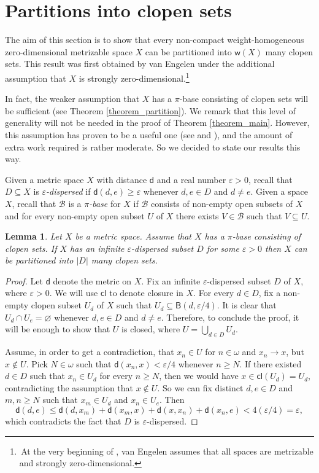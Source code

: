 \documentclass{amsart}
\theoremstyle{plain}
\newtheorem{lemma}[theorem]{Lemma}
\theoremstyle{definition}
\newcommand{\Ball}{\mathsf{B}}
\newcommand{\di}{\mathsf{d}}
\newcommand{\cl}{\mathsf{cl}}
\newcommand{\weight}{\mathsf{w}}
\newcommand{\BB}{\mathcal{B}}
\begin{document}
\section{Partitions into clopen sets}

The aim of this section is to show that every non-compact weight-homogeneous zero-dimensional metrizable space $X$ can be partitioned into $\weight(X)$ many clopen sets. This result was first obtained by van Engelen \cite[Lemma 2.1]{van_engelen} under the additional assumption that $X$ is strongly zero-dimensional.\footnote{\,At the very beginning of \cite[Section 2]{van_engelen}, van Engelen assumes that all spaces are metrizable and strongly zero-dimensional.}

In fact, the weaker assumption that $X$ has a $\pi$-base consisting of clopen sets will be sufficient (see Theorem \ref{theorem_partition}). We remark that this level of generality will not be needed in the proof of Theorem \ref{theorem_main}. However, this assumption has proven to be a useful one (see \cite{medini_products} and \cite{terada}), and the amount of extra work required is rather moderate. So we decided to state our results this way.

Given a metric space $X$ with distance $\di$ and a real number $\varepsilon >0$, recall that $D\subseteq X$ is \emph{$\varepsilon$-dispersed} if $\di(d,e)\geq\varepsilon$ whenever $d,e\in D$ and $d\neq e$. Given a space $X$, recall that $\BB$ is a \emph{$\pi$-base} for $X$ if $\BB$ consists of non-empty open subsets of $X$ and for every non-empty open subset $U$ of $X$ there exists $V\in\BB$ such that $V\subseteq U$.

\begin{lemma}\label{lemma_epsilon_dispersed}
Let $X$ be a metric space. Assume that $X$ has a $\pi$-base consisting of clopen sets. If $X$ has an infinite $\varepsilon$-dispersed subset $D$ for some $\varepsilon>0$ then $X$ can be partitioned into $|D|$ many clopen sets.
\end{lemma}
\begin{proof}
Let $\di$ denote the metric on $X$. Fix an infinite $\varepsilon$-dispersed subset $D$ of $X$, where $\varepsilon >0$. We will use $\cl$ to denote closure in $X$. For every $d\in D$, fix a non-empty clopen subset $U_d$ of $X$ such that $U_d\subseteq\Ball(d,\varepsilon/4)$. It is clear that $U_d\cap U_e=\varnothing$ whenever $d,e\in D$ and $d\neq e$. Therefore, to conclude the proof, it will be enough to show that $U$ is closed, where $U=\bigcup_{d\in D}U_d$.

Assume, in order to get a contradiction, that $x_n\in U$ for $n\in\omega$ and $x_n\to x$, but $x\notin U$. Pick $N\in\omega$ such that $\di(x_n,x)<\varepsilon/4$ whenever $n\geq N$. If there existed $d\in D$ such that $x_n\in U_d$ for every $n\geq N$, then we would have $x\in\cl(U_d)=U_d$, contradicting the assumption that $x\notin U$. So we can fix distinct $d,e\in D$ and $m,n\geq N$ such that $x_m\in U_d$ and $x_n\in U_e$. Then
$$
\di(d,e)\leq\di(d,x_m)+\di(x_m,x)+\di(x,x_n)+\di(x_n,e)<4(\varepsilon/4)=\varepsilon,
$$
which contradicts the fact that $D$ is $\varepsilon$-dispersed.
\end{proof}
\end{document}
